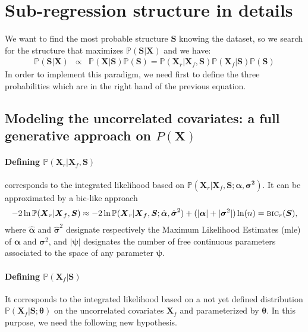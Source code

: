 \documentclass[12pt,a4paper]{report}
\begin{document}
	

\section{Sub-regression structure in details}
We want to find the most probable structure $\boldsymbol{S}$ knowing the dataset, so we search for the structure that maximizes $\mathbb{P}(\boldsymbol{S}|\boldsymbol{X})$ and we have:	
	\begin{eqnarray}
	 \label{approxBIC} \mathbb{P}(\boldsymbol{S}|\boldsymbol{X})&\propto & \mathbb{P}(\boldsymbol{X}|\boldsymbol{S})\mathbb{P}(\boldsymbol{S})
	=\mathbb{P}(\boldsymbol{X}_r|\boldsymbol{X}_f,\boldsymbol{S})\mathbb{P}(\boldsymbol{X}_f|\boldsymbol{S})\mathbb{P}(\boldsymbol{S})
	\end{eqnarray}
In order to implement this paradigm, we need first to define the three probabilities which are in the right hand of the previous equation.
	\subsection{Modeling the uncorrelated covariates: a full generative approach on $P(\boldsymbol{X})$} \label{sectionfullgen}
	

\paragraph{Defining $\mathbb{P}(\boldsymbol{X}_r|\boldsymbol{X}_f,\boldsymbol{S})$} corresponds to the integrated likelihood based on $\mathbb{P}(\boldsymbol{X}_r | \boldsymbol{X}_f,\boldsymbol{S};\boldsymbol{\alpha},\boldsymbol{\sigma^2})$. It can be approximated by a {\sc bic}-like approach \cite{Sch1978}
\begin{equation}
-2\ln \mathbb{P}(\boldsymbol{X}_r|\boldsymbol{X}_f,\boldsymbol{S}) \approx -2\ln \mathbb{P}(\boldsymbol{X}_r | \boldsymbol{X}_f,\boldsymbol{S};\hat{\boldsymbol{\alpha}},\hat{\boldsymbol{\sigma}}^2) + (|{\boldsymbol{\alpha}}| + |{\boldsymbol{\sigma}}^2|) \ln(n) = \mbox{{\sc bic}}_r(\boldsymbol{S}),
\end{equation}
where $\hat{\boldsymbol{\alpha}}$ and $\hat{\boldsymbol{\sigma}}^2$ designate respectively the Maximum Likelihood Estimates ({\sc mle}) of ${\boldsymbol{\alpha}}$ and ${\boldsymbol{\sigma}}^2$, and $|\boldsymbol{\psi}|$ designates the number of free continuous parameters associated to the space of any parameter $\boldsymbol{\psi}$.

\paragraph{Defining $\mathbb{P}(\boldsymbol{X}_f|\boldsymbol{S})$} It corresponds to the integrated likelihood based on a not yet defined distribution $\mathbb{P}(\boldsymbol{X}_f|\boldsymbol{S};\boldsymbol{\theta})$ on the uncorrelated covariates $\boldsymbol{X}_f$ and parameterized by $\boldsymbol{\theta}$. In this purpose, we need the following new hypothesis.
\end{document}
